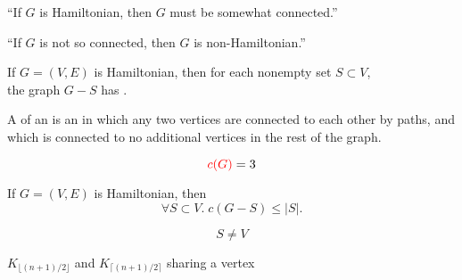 
\begin{frame}{}
  \begin{center}
    ``If $G$ is Hamiltonian, then $G$ must be somewhat connected.''


    \pause
    ``If $G$ is not so connected, then $G$ is non-Hamiltonian.''
  \end{center}
\end{frame}

\begin{frame}{}
  \begin{theorem}{}
    If $G = (V, E)$ is Hamiltonian,
    then for each nonempty set $S \subset V$, \\[3pt]
    the graph $G - S$ has  .
  \end{theorem}
\end{frame}

\begin{frame}{}
  \begin{definition}
    A  of an 
    is an  in which any two vertices are connected to each other by paths,
    and which is connected to no additional vertices in the rest of the graph.
  \end{definition}

  \vspace{0.20cm}

  \pause
  \vspace{-0.20cm}
  \[
    \textcolor{red}{c(G)} = 3
  \]
\end{frame}

\begin{frame}{}
  \begin{theorem}{}
    If $G = (V, E)$ is Hamiltonian, then
    \[
      \forall S \subset V.\; c(G - S) \le |S|.
    \]
  \end{theorem}

  \pause
  \vspace{0.30cm}
  \[
    S \neq V
  \]

  \pause
  \vspace{0.30cm}
  \begin{center}
    $K_{\lfloor (n + 1)/ 2 \rfloor}$ and $K_{\lceil (n+1)/2 \rceil}$
    sharing a vertex
  \end{center}
\end{frame}

